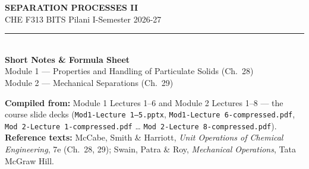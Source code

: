 \documentclass[10pt,a4paper]{article}
\begin{document}
\begin{center}
{\LARGE\bfseries\color{accent} SEPARATION PROCESSES II}\\[2pt]
{\color{accent2} CHE F313 \textperiodcentered{} BITS Pilani \textperiodcentered{} I-Semester 2026-27}\\[4pt]
{\color{rule}\rule{0.6\linewidth}{0.8pt}}\\[6pt]
{\Large\bfseries\color{accent} Short Notes \& Formula Sheet}\\[4pt]
{\color{accent2} Module 1 --- Properties and Handling of Particulate Solids (Ch.~28)\\
 Module 2 --- Mechanical Separations (Ch.~29)}
\end{center}

\vspace{2mm}
\begin{daybox}
\textbf{Compiled from:} Module 1 Lectures 1--6 and Module 2 Lectures 1--8 --- the course slide decks (\texttt{Mod1-Lecture 1--5.pptx}, \texttt{Mod1-Lecture 6-compressed.pdf}, \texttt{Mod 2-Lecture 1-compressed.pdf} \dots{} \texttt{Mod 2-Lecture 8-compressed.pdf}).\\[2pt]
\textbf{Reference texts:} McCabe, Smith \& Harriott, \emph{Unit Operations of Chemical Engineering}, 7e (Ch.~28, 29); Swain, Patra \& Roy, \emph{Mechanical Operations}, Tata McGraw Hill.
\end{daybox}
\end{document}
